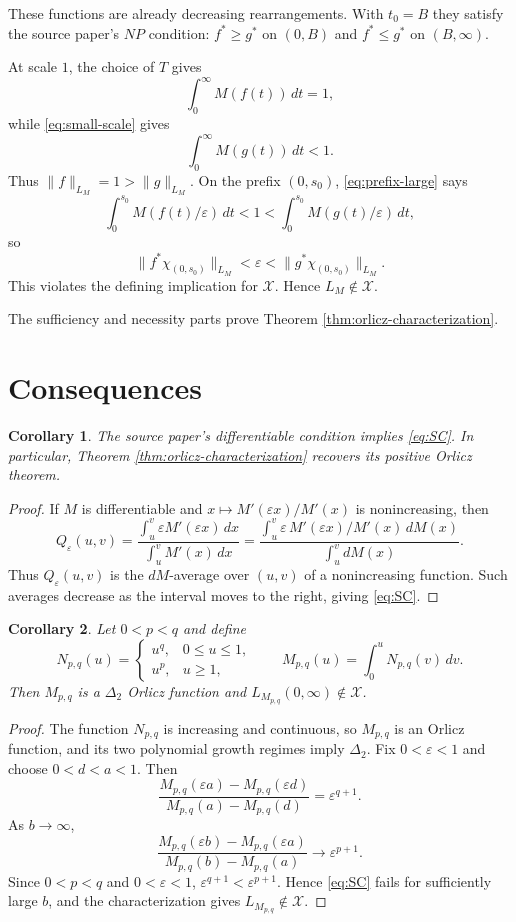 \documentclass[11pt]{article}
\newtheorem{corollary}{Corollary}
\newcommand{\Xclass}{\mathcal X}
\newcommand{\eps}{\varepsilon}
\begin{document}
These functions are already decreasing rearrangements. With $t_0=B$ they
satisfy the source paper's $NP$ condition: $f^*\ge g^*$ on $(0,B)$ and
$f^*\le g^*$ on $(B,\infty)$.

At scale $1$, the choice of $T$ gives
\[
 \int_0^\infty M(f(t))\,dt=1,
\]
while \eqref{eq:small-scale} gives
\[
 \int_0^\infty M(g(t))\,dt<1.
\]
Thus $\|f\|_{L_M}=1>\|g\|_{L_M}$. On the prefix $(0,s_0)$,
\eqref{eq:prefix-large} says
\[
 \int_0^{s_0}M(f(t)/\eps)\,dt<1<
 \int_0^{s_0}M(g(t)/\eps)\,dt,
\]
so
\[
 \|f^*\chi_{(0,s_0)}\|_{L_M}<\eps<
 \|g^*\chi_{(0,s_0)}\|_{L_M}.
\]
This violates the defining implication for $\Xclass$. Hence
$L_M\notin\Xclass$.

The sufficiency and necessity parts prove Theorem
\ref{thm:orlicz-characterization}.

\section*{Consequences}

\begin{corollary}
The source paper's differentiable condition implies \eqref{eq:SC}. In
particular, Theorem \ref{thm:orlicz-characterization} recovers its positive
Orlicz theorem.
\end{corollary}

\begin{proof}
If $M$ is differentiable and $x\mapsto M'(\eps x)/M'(x)$ is nonincreasing,
then
\[
 Q_\eps(u,v)
 =\frac{\int_u^v \eps M'(\eps x)\,dx}{\int_u^v M'(x)\,dx}
 =\frac{\int_u^v \eps\,M'(\eps x)/M'(x)\,dM(x)}
        {\int_u^v dM(x)}.
\]
Thus $Q_\eps(u,v)$ is the $dM$-average over $(u,v)$ of a nonincreasing
function. Such averages decrease as the interval moves to the right, giving
\eqref{eq:SC}.
\end{proof}

\begin{corollary}
\label{cor:decreasing-power}
Let $0<p<q$ and define
\[
 N_{p,q}(u)=
 \begin{cases}
   u^q, & 0\le u\le 1,\\
   u^p, & u\ge 1,
 \end{cases}
 \qquad
 M_{p,q}(u)=\int_0^u N_{p,q}(v)\,dv .
\]
Then $M_{p,q}$ is a $\Delta_2$ Orlicz function and
$L_{M_{p,q}}(0,\infty)\notin\Xclass$.
\end{corollary}

\begin{proof}
The function $N_{p,q}$ is increasing and continuous, so $M_{p,q}$ is an
Orlicz function, and its two polynomial growth regimes imply $\Delta_2$.
Fix $0<\eps<1$ and choose $0<d<a<1$. Then
\[
\frac{M_{p,q}(\eps a)-M_{p,q}(\eps d)}
     {M_{p,q}(a)-M_{p,q}(d)}
=\eps^{q+1}.
\]
As $b\to\infty$,
\[
\frac{M_{p,q}(\eps b)-M_{p,q}(\eps a)}
     {M_{p,q}(b)-M_{p,q}(a)}
\longrightarrow \eps^{p+1}.
\]
Since $0<p<q$ and $0<\eps<1$, $\eps^{q+1}<\eps^{p+1}$. Hence
\eqref{eq:SC} fails for sufficiently large $b$, and the characterization
gives $L_{M_{p,q}}\notin\Xclass$.
\end{proof}
\end{document}
